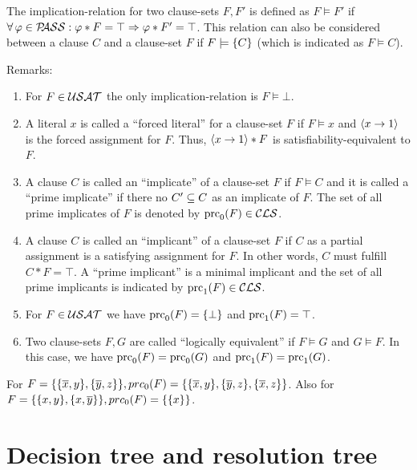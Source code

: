 \documentclass{report}
\begin{document}
\begin{defi}\label{def:imp-rel}
The implication-relation for two clause-sets $F, F'$ is defined as $F \models F'$ if $\forall\, \varphi \in \mathcal{P\hspace{-0.32em}ASS} : \varphi * F = \top \Rightarrow \varphi * F' = \top$. This relation can also be considered between a clause $C$ and a clause-set $F$ if $F \models \{ C \}$ (which is indicated as $F \models C$).
\end{defi}
Remarks:
  \begin{enumerate}
  \item For  $F \in \mathcal{USAT}$ the only implication-relation is $F \models \bot$.
  \item A literal $x$ is called a ``forced literal'' for a clause-set $F$ if $F \models x$ and $\langle x \rightarrow 1 \rangle$ is the forced assignment for $F$. Thus,  $\langle x \rightarrow 1 \rangle * F$ is satisfiability-equivalent to $F$.
  \item A clause $C$ is called an ``implicate'' of a clause-set $F$ if $F \models C$ and it is called a ``prime implicate'' if there no $ C' \subseteq C$ as an implicate of $F$. The set of all prime implicates of $F$ is denoted by $\operatorname{prc}_0(F) \in \mathcal{CLS}$.
  \item A clause $C$ is called an ``implicant'' of a clause-set $F$ if $C$ as a partial assignment is a satisfying assignment for $F$. In other words, $C$ must fulfill $C * F=\top$. A ``prime implicant'' is a minimal implicant and the set of all prime implicants is indicated by $\operatorname{prc}_1(F) \in \mathcal{CLS}$. 
  \item For $F \in \mathcal{USAT}$ we have $\operatorname{prc}_0(F) = \{ \bot \}$ and $\operatorname{prc}_1(F) = \top$.
  \item Two clause-sets $F, G$ are called ``logically equivalent'' if $F \models G$ and $G \models F$. In this case, we have $\operatorname{prc}_0(F) = \operatorname{prc}_0(G)$ and $\operatorname{prc}_1(F) = \operatorname{prc}_1(G)$.
  \end{enumerate}

\begin{examp}\label{exp:bbb}
For $F = \{\{ \overline x, y\} , \{ \overline y, z\}\}, prc_0(F) = \{\{\overline x, y\} , \{\overline y, z\} , \{\overline x, z\}\}$. Also for $F = \{ \{ x, y \} , \{ x,\overline y \} \}, prc_0(F) = \{ \{ x \} \}$.
\end{examp}

\section{Decision tree and resolution tree}
\label{sec:trees}
\end{document}
